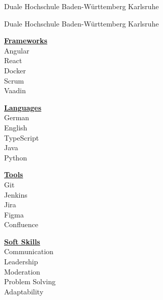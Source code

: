 \documentclass[10pt, a4paper]{cvhari}
\begin{document}
    \bigskip
    
    {Duale Hochschule Baden-Württemberg Karlsruhe}\par
    
    \smallskip 
    \dividergray
    \smallskip
    
    {Duale Hochschule Baden-Württemberg Karlsruhe}\par
    \medskip

\medskip

    \bigskip
    \begin{minipage}[t]{0.23\textwidth}
            \centering
            \underline{\textbf{Frameworks}}\\[0.5em]
            Angular\\
            React\\
            Docker\\
            Scrum\\
            Vaadin\\
    \end{minipage}
    \hfill
    \begin{minipage}[t]{0.23\textwidth}
            \centering
            \underline{\textbf{Languages}}\\[0.5em]
            German\\
            English\\
            TypeScript\\
            Java\\
            Python\\
    \end{minipage}
    \hfill
    \begin{minipage}[t]{0.23\textwidth}
            \centering
            \underline{\textbf{Tools}}\\[0.5em]
            Git\\
            Jenkins\\
            Jira\\
            Figma\\
            Confluence\\
    \end{minipage}
    \hfill
    \begin{minipage}[t]{0.23\textwidth}
            \centering
            \underline{\textbf{Soft Skills}}\\[0.5em]
            Communication\\
            Leadership\\
            Moderation\\
            Problem Solving\\
            Adaptability\\
    \end{minipage}
\medskip
\end{document}
